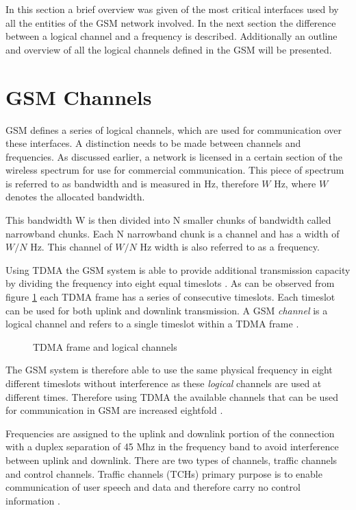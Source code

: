 In this section a brief overview was given of the most critical interfaces used by all the entities of the GSM network involved. In the next section the difference between a logical channel and a frequency is described. Additionally an outline and overview of all the logical channels defined in the GSM will be presented. 
\section{GSM Channels}
\label{sec:interfacech}
GSM defines a series of logical channels, which are used for communication over these interfaces. A distinction needs to be made between channels and frequencies. As discussed earlier, a network is licensed in a certain section of the wireless spectrum for use for commercial communication. This piece of spectrum is referred to as bandwidth and is measured in Hz, therefore $W$ Hz, where $W$ denotes the allocated bandwidth\cite{FundamentalsWirelessCommunication}.

This bandwidth W is then divided into N smaller chunks of bandwidth called narrowband chunks. Each N narrowband chunk is a channel and has a width of $W/N$ Hz\cite{FundamentalsWirelessCommunication}. This channel of $W/N$ Hz width is also referred to as a frequency.\label{def:channel}

Using TDMA the GSM system is able to provide additional transmission capacity by dividing the frequency into eight equal timeslots \cite{wirelesstelcoMullet}. 
As can be observed from figure \ref{fig:GSMChannels} each TDMA frame has a series of consecutive timeslots. Each timeslot can be used for both uplink and downlink transmission. A GSM \emph{channel} is a logical channel and refers to a single timeslot within a TDMA frame \cite{wirelesstelcoMullet,GSMArchitectureProtocolsServices}.
\begin{figure}[H]
	\begin{centering}
		
		\caption{TDMA frame and logical channels \cite{wirelesstelcoMullet}}
		\label{fig:GSMChannels}
	\end{centering}
\end{figure}
The GSM system is therefore able to use the same physical frequency in eight different timeslots without interference as these \emph{logical} channels are used at different times. Therefore using TDMA the available channels that can be used for communication in GSM are increased eightfold \cite{wirelesstelcoMullet}.

Frequencies are assigned to the uplink and downlink portion of the connection with a duplex separation of 45 Mhz in the frequency band to avoid interference between uplink and downlink. There are two types of channels, traffic channels and control channels. Traffic channels (TCHs) primary purpose is to enable communication of user speech and data and therefore carry no control information \cite{GSMArchitectureProtocolsServices}.

